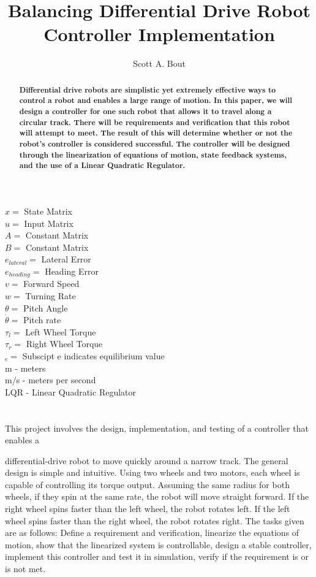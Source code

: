 \documentclass[10pt, letterbox]{article}
\title{\textbf{Balancing Differential Drive Robot Controller Implementation}}
\author{Scott A. Bout}
\affil{\textit{University of Illinois Urbana-Champaign, Urbana-Chamapaign, IL, 61820}}
\date{}
\begin{document}
\maketitle 
\begin{abstract}
\textbf{Differential drive robots are simplistic yet extremely effective ways to control a robot and enables a large range of motion. In this paper, we will design a controller for one such robot that allows it to travel along a circular track. There will be requirements and verification that this robot will attempt to meet. The result of this will determine whether or not the robot's controller is considered successful. The controller will be designed through the linearization of equations of motion, state feedback systems, and the use of a Linear Quadratic Regulator.}   
\end{abstract}
\section{}
$x = $ State Matrix\\
$u = $ Input Matrix\\
$A = $ Constant Matrix\\
$B = $ Constant Matrix\\
$e_{lateral} = $ Lateral Error\\
$e_{heading} = $ Heading Error\\
$v = $ Forward Speed\\
$w = $ Turning Rate\\
$\theta = $ Pitch Angle\\
$\dot{\theta} = $ Pitch rate\\
$\tau_{l} = $ Left Wheel Torque\\
$\tau_{r} = $ Right Wheel Torque\\
$_e = $ Subscipt e indicates equilibrium value\\
m - meters\\
m/s - meters per second\\
LQR - Linear Quadratic Regulator
\section{}
\begin{addmargin}[5em]{0em}
This project involves the design, implementation, and testing of a controller that enables a \end{addmargin}differential-drive robot to move quickly around a narrow track. The general design is simple and intuitive. Using two wheels and two motors, each wheel is capable of controlling its torque output. Assuming the same radius for both wheels, if they spin at the same rate, the robot will move straight forward. If the right wheel spins faster than the left wheel, the robot rotates left. If the left wheel spins faster than the right wheel, the robot rotates right. The tasks given are as follows: Define a requirement and verification, linearize the equations of motion, show that the linearized system is controllable, design a stable controller, implement this controller and test it in simulation, verify if the requirement is or is not met.
\end{document}
